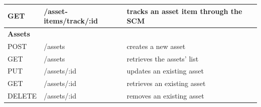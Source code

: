 \begin{table}[htb]
\begin{center}
\begin{tabular}{|l|p{4.5cm}|p{7.664cm}|}
        \hline 
        GET & /asset-items/track/:id & tracks an asset item through the SCM\\
        \hline
        \cellcolor{cyan}\textbf{Assets}  & \cellcolor{cyan}\textbf{} & \cellcolor{cyan}\textbf{} \\
        \hline 
        POST & /assets & creates a new asset\\
        \hline 
        GET & /assets & retrieves the assets' list\\
        \hline 
        PUT & /assets/:id & updates an existing asset\\
        \hline 
        GET & /assets/:id & retrieves an existing asset\\
        \hline 
        DELETE & /assets/:id & removes an existing asset\\
        \hline 
    \end{tabular}
    \end{center}
\end{table}
